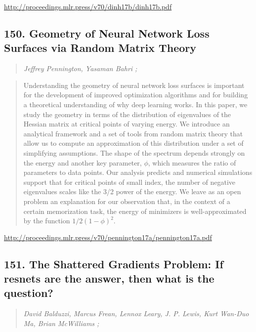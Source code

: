 \documentclass{article}
\begin{document}
\href{http://proceedings.mlr.press/v70/dinh17b/dinh17b.pdf}{http://proceedings.mlr.press/v70/dinh17b/dinh17b.pdf}

\subsection{150. Geometry of Neural Network Loss Surfaces via Random Matrix Theory}

\begin{quote}
\footnotesize{\textit{Jeffrey Pennington, Yasaman Bahri ;}}

\end{quote}

\begin{quote}
    Understanding the geometry of neural network loss surfaces is important for the development of improved optimization algorithms and for building a theoretical understanding of why deep learning works. In this paper, we study the geometry in terms of the distribution of eigenvalues of the Hessian matrix at critical points of varying energy. We introduce an analytical framework and a set of tools from random matrix theory that allow us to compute an approximation of this distribution under a set of simplifying assumptions. The shape of the spectrum depends strongly on the energy and another key parameter, $\phi$, which measures the ratio of parameters to data points. Our analysis predicts and numerical simulations support that for critical points of small index, the number of negative eigenvalues scales like the 3/2 power of the energy. We leave as an open problem an explanation for our observation that, in the context of a certain memorization task, the energy of minimizers is well-approximated by the function $1/2(1-\phi)^2$.  
\end{quote}

\href{http://proceedings.mlr.press/v70/pennington17a/pennington17a.pdf}{http://proceedings.mlr.press/v70/pennington17a/pennington17a.pdf}

\subsection{151. The Shattered Gradients Problem: If resnets are the answer, then what is the question?}

\begin{quote}
\footnotesize{\textit{David Balduzzi, Marcus Frean, Lennox Leary, J. P. Lewis, Kurt Wan-Duo Ma, Brian McWilliams ;}}

\end{quote}
\end{document}
